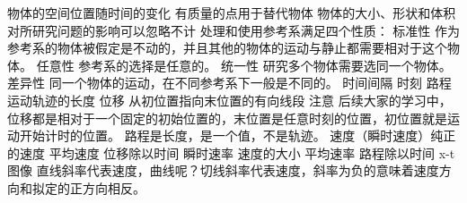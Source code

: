\markdownRendererDocumentBegin
\markdownRendererSectionBegin
\markdownRendererSectionBegin
{}\markdownRendererInterblockSeparator
{}\markdownRendererSectionBegin
{}\markdownRendererInterblockSeparator
{}物体的空间位置随时间的变化\markdownRendererInterblockSeparator
{}
\markdownRendererSectionEnd \markdownRendererSectionBegin
{}\markdownRendererInterblockSeparator
{}有质量的点用于替代物体\markdownRendererParagraphSeparator
{}物体的大小、形状和体积对所研究问题的影响可以忽略不计\markdownRendererInterblockSeparator
{}
\markdownRendererSectionEnd \markdownRendererSectionBegin
{}\markdownRendererInterblockSeparator
{}处理和使用参考系满足四个性质：\markdownRendererParagraphSeparator
{}标准性 作为参考系的物体被假定是不动的，并且其他的物体的运动与静止都需要相对于这个物体。\markdownRendererSoftLineBreak
{}任意性 参考系的选择是任意的。\markdownRendererSoftLineBreak
{}统一性 研究多个物体需要选同一个物体。\markdownRendererSoftLineBreak
{}差异性 同一个物体的运动，在不同参考系下一般是不同的。\markdownRendererInterblockSeparator
{}
\markdownRendererSectionEnd \markdownRendererSectionBegin
{}\markdownRendererInterblockSeparator
{}时间间隔\markdownRendererParagraphSeparator
{}时刻\markdownRendererInterblockSeparator
{}
\markdownRendererSectionEnd \markdownRendererSectionBegin
{}\markdownRendererInterblockSeparator
{}路程 运动轨迹的长度\markdownRendererParagraphSeparator
{}位移 从初位置指向末位置的有向线段\markdownRendererParagraphSeparator
{}注意\markdownRendererSoftLineBreak
{}后续大家的学习中，位移都是相对于一个固定的初始位置的，末位置是任意时刻的位置，初位置就是运动开始计时的位置。\markdownRendererSoftLineBreak
{}路程是长度，是一个值，不是轨迹。\markdownRendererInterblockSeparator
{}
\markdownRendererSectionEnd 
\markdownRendererSectionEnd \markdownRendererSectionBegin
{}\markdownRendererInterblockSeparator
{}速度（瞬时速度）纯正的速度\markdownRendererParagraphSeparator
{}平均速度 位移除以时间\markdownRendererParagraphSeparator
{}瞬时速率 速度的大小\markdownRendererParagraphSeparator
{}平均速率 路程除以时间\markdownRendererParagraphSeparator
{}x-t图像\markdownRendererSoftLineBreak
{}直线斜率代表速度，曲线呢？切线斜率代表速度，斜率为负的意味着速度方向和拟定的正方向相反。\markdownRendererInterblockSeparator
{}\markdownRendererSectionBegin
{}\markdownRendererInterblockSeparator
